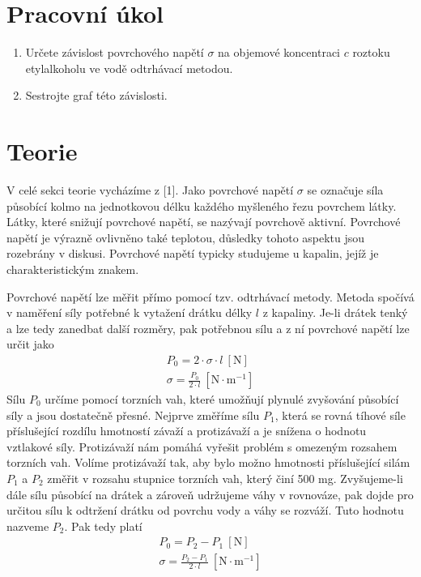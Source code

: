 \documentclass[a4paper]{article}
\author{"Patrik Novotný"}
\begin{document}
\section*{Pracovní úkol}
\begin{enumerate}
\item Určete závislost povrchového napětí $\sigma$ na objemové koncentraci $c$ roztoku etylalkoholu ve vodě odtrhávací metodou.
\item Sestrojte graf této závislosti.
\end{enumerate}
\section*{Teorie}
\par V celé sekci teorie vycházíme z [1]. Jako povrchové napětí $\sigma$ se označuje síla působící kolmo na jednotkovou délku každého myšleného řezu povrchem látky. Látky, které snižují povrchové napětí, se nazývají povrchově aktivní. Povrchové napětí je výrazně ovlivněno také teplotou, důsledky tohoto aspektu jsou rozebrány v diskusi.
Povrchové napětí typicky studujeme u kapalin, jejíž je charakteristickým znakem.
\par Povrchové napětí lze měřit přímo pomocí tzv. odtrhávací metody. Metoda spočívá v naměření síly potřebné k vytažení drátku délky $l$ z kapaliny. Je-li drátek tenký a lze tedy zanedbat další rozměry, pak potřebnou sílu a z ní povrchové napětí lze určit jako
\begin{align}
P_{0} = 2 \cdot \sigma \cdot l \: \mathrm{[N]} \\
\sigma = \frac{P_{0}}{2 \cdot l} \: \mathrm{[N \cdot m^{-1}]}
\end{align}
Sílu $P_{0}$ určíme pomocí torzních vah, které umožňují plynulé zvyšování působící síly a jsou dostatečně přesné. Nejprve změříme sílu $P_{1}$, která se rovná tíhové síle příslušející rozdílu hmotností závaží a protizávaží a je snížena o hodnotu vztlakové síly. Protizávaží nám pomáhá vyřešit problém s omezeným rozsahem torzních vah. Volíme protizávaží tak, aby bylo možno hmotnosti příslušející silám $P_{1}$ a $P_{2}$ změřit v rozsahu stupnice torzních vah, který činí 500 mg. Zvyšujeme-li dále sílu působící na drátek a zároveň udržujeme váhy v rovnováze, pak dojde pro určitou sílu k odtržení drátku od povrchu vody a váhy se rozváží. Tuto hodnotu nazveme $P_{2}$. Pak tedy platí
\begin{align}
P_{0} = P_{2} - P_{1}  \: \mathrm{[N]} \\
\sigma = \frac{P_{2} - P_{1}}{2 \cdot l} \: \mathrm{[N \cdot m^{-1}]}
\end{align}
\end{document}
